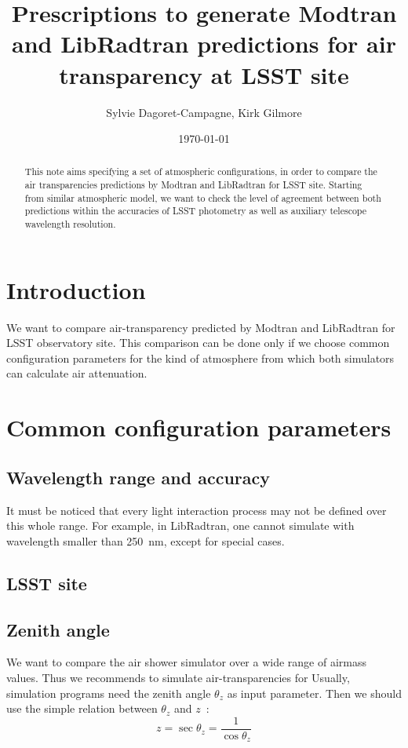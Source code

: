 \documentclass[a4paper]{article}
\title{Prescriptions to generate Modtran and LibRadtran predictions for air transparency at LSST site}
\author{Sylvie Dagoret-Campagne, Kirk Gilmore}
\date{\today}
\begin{document}
\maketitle

\begin{abstract}
This note aims specifying a set of atmospheric configurations, in order to compare the air transparencies predictions  by Modtran and LibRadtran for LSST site.
Starting from similar atmospheric model, we want to check the level of agreement between both predictions within
the accuracies of LSST photometry as well as auxiliary telescope wavelength resolution. 
\end{abstract}

\section{Introduction}
\label{sec:introduction}
We want to compare air-transparency predicted by Modtran and LibRadtran for LSST observatory site.
This comparison can be done only if we choose common configuration parameters for the kind of atmosphere  from which both simulators can calculate air attenuation.

\section{Common configuration parameters}


\subsection{Wavelength range and accuracy}

It must be noticed that every light interaction process may not be defined over this whole range. For example, in LibRadtran, one cannot simulate with wavelength smaller than 250~nm, except for special cases. 

\subsection{LSST site}

\subsection{Zenith angle}
We want to compare the air shower simulator over a wide range of airmass values. Thus we recommends to  simulate air-transparencies for  
Usually, simulation programs need the zenith angle $\theta_{z}$ as input parameter.
Then we should use the simple relation between $\theta_{z}$ and $z$~:
\begin{equation}
z=\sec \theta_{z}=\frac{1}{\cos \theta_z}
\end{equation}
\end{document}
